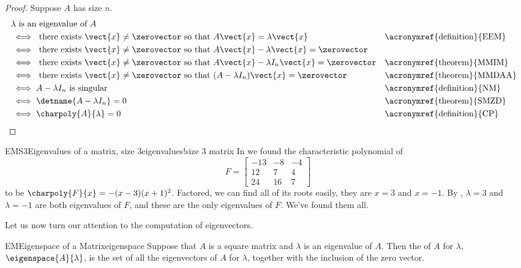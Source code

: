 %
\begin{proof}
%
Suppose $A$ has size $n$.
%
\begin{align*}
&\text{$\lambda$ is an eigenvalue of $A$}\\
%
&\iff\text{ there exists $\vect{x}\neq\zerovector$ so that $A\vect{x}=\lambda\vect{x}$}
&&\text{\acronymref{definition}{EEM}}\\
%
&\iff \text{ there exists $\vect{x}\neq\zerovector$ so that $A\vect{x}-\lambda\vect{x}=\zerovector$}\\
%
&\iff \text{ there exists $\vect{x}\neq\zerovector$ so that $A\vect{x}-\lambda I_n\vect{x}=\zerovector$}
&&\text{\acronymref{theorem}{MMIM}}\\
%
&\iff\text{ there exists $\vect{x}\neq\zerovector$ so that $(A-\lambda I_n)\vect{x}=\zerovector$}
&&\text{\acronymref{theorem}{MMDAA}}\\
%
&\iff A-\lambda I_n\text{ is singular}
&&\text{\acronymref{definition}{NM}}\\
%
&\iff\detname{A-\lambda I_n}=0
&&\text{\acronymref{theorem}{SMZD}}\\
%
&\iff\charpoly{A}{\lambda}=0
&&\text{\acronymref{definition}{CP}}
%
\end{align*}
%
\end{proof}
%
\begin{example}{EMS3}{Eigenvalues of a matrix, size 3}{eigenvalues!size 3 matrix}
In  we found the characteristic polynomial of
%
\begin{equation*}
F=
\begin{bmatrix}
-13 & -8 & -4\\
12 & 7 & 4\\
24 & 16 & 7
\end{bmatrix}
\end{equation*}
%
to be  $\charpoly{F}{x}=-(x-3)(x+1)^2$.  Factored, we can find all of its roots easily, they are $x=3$ and $x=-1$.  By , $\lambda=3$ and $\lambda=-1$ are both eigenvalues of $F$, and these are the only eigenvalues of $F$.  We've found them all.
%
\end{example}
%
Let us now turn our attention to the computation of eigenvectors.
%
\begin{definition}{EM}{Eigenspace of a Matrix}{eigenspace}
Suppose that $A$ is a square matrix and $\lambda$ is an eigenvalue of $A$.  Then the  of $A$ for $\lambda$, $\eigenspace{A}{\lambda}$, is the set of all the eigenvectors of $A$ for $\lambda$, together with the inclusion of the zero vector.
\end{definition}
